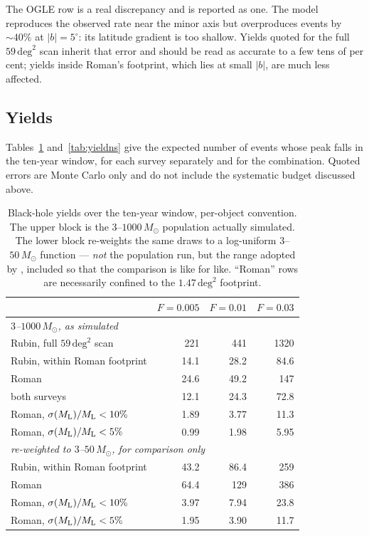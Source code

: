 \documentclass[english,10pt,a4paper]{article}
\newcommand{\Ml}{M_{\rm L}}
\newcommand{\Msun}{M_\odot}
\begin{document}
The OGLE row is a real discrepancy and is reported as one. The model reproduces the
observed rate near the minor axis but overproduces events by $\sim\!40\%$ at $|b|=5^\circ$: its
latitude gradient is too shallow. Yields quoted for the full $59\,\mathrm{deg}^2$ scan inherit
that error and should be read as accurate to a few tens of per cent; yields inside Roman's
footprint, which lies at small $|b|$, are much less affected.

\subsection{Yields}

Tables~\ref{tab:yieldbh} and~\ref{tab:yieldns} give the expected number of events whose peak falls
in the ten-year window, for each survey separately and for the combination. Quoted errors are
Monte Carlo only and do not include the systematic budget discussed above.

\begin{table}[h]
\centering
\caption{Black-hole yields over the ten-year window, per-object convention. The upper block is the
$3$--$1000\,\Msun$ population actually simulated. The lower block re-weights the same draws to a
log-uniform $3$--$50\,\Msun$ function --- \emph{not} the population run, but the range adopted by
\citet{SajadianSahu2023}, included so that the comparison is like for like. ``Roman'' rows are
necessarily confined to the $1.47\,\mathrm{deg}^2$ footprint.}
\label{tab:yieldbh}
\begin{tabular}{lrrr}
\toprule
 & $F=0.005$ & $F=0.01$ & $F=0.03$ \\
\midrule
\multicolumn{4}{l}{\emph{$3$--$1000\,\Msun$, as simulated}}\\
Rubin, full $59\,\mathrm{deg}^2$ scan  & 221   & 441   & 1320 \\
Rubin, within Roman footprint          & 14.1  & 28.2  & 84.6 \\
Roman                                  & 24.6  & 49.2  & 147  \\
both surveys                           & 12.1  & 24.3  & 72.8 \\
Roman, $\sigma(\Ml)/\Ml<10\%$          & 1.89  & 3.77  & 11.3 \\
Roman, $\sigma(\Ml)/\Ml<5\%$           & 0.99  & 1.98  & 5.95 \\
\midrule
\multicolumn{4}{l}{\emph{re-weighted to $3$--$50\,\Msun$, for comparison only}}\\
Rubin, within Roman footprint          & 43.2  & 86.4  & 259  \\
Roman                                  & 64.4  & 129   & 386  \\
Roman, $\sigma(\Ml)/\Ml<10\%$          & 3.97  & 7.94  & 23.8 \\
Roman, $\sigma(\Ml)/\Ml<5\%$           & 1.95  & 3.90  & 11.7 \\
\bottomrule
\end{tabular}
\end{table}
\end{document}
